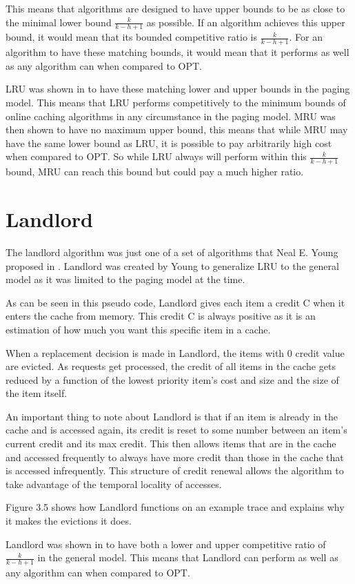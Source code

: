 This means that algorithms are designed to have upper bounds to be as close to the minimal lower bound $\frac{k}{k-h+1}$ as possible. If an algorithm achieves this upper bound, it would mean that its bounded competitive ratio is $\frac{k}{k-h+1}$. For an algorithm to have these matching bounds, it would mean that it performs as well as any algorithm can when compared to OPT.

LRU was shown in \cite{sleator1985amortized} to have these matching lower and upper bounds in the paging model. This means that LRU performs competitively to the minimum bounds of online caching algorithms in any circumstance in the paging model.
MRU was then shown \cite{agrawal2007worst} to have no maximum upper bound, this means that while MRU may have the same lower bound as LRU, it is possible to pay arbitrarily high cost when compared to OPT. So while LRU always will perform within this $\frac{k}{k-h+1}$ bound, MRU can reach this bound but could pay a much higher ratio.


\hfill \break
\hfill \break
\hfill \break


\section{Landlord}
The landlord algorithm was just one of a set of algorithms that Neal E. Young proposed in \cite{young1994k}. Landlord was created by Young to generalize LRU to the general model as it was limited to the paging model at the time. 



As can be seen in this pseudo code, Landlord gives each item a credit C when it enters the cache from memory. This credit C is always positive as it is an estimation of how much you want this specific item in a cache.

When a replacement decision is made in Landlord, the items with 0 credit value are evicted. As requests get processed, the credit of all items in the cache gets reduced by a function of the lowest priority item's cost and size and the size of the item itself.

An important thing to note about Landlord is that if an item is already in the cache and is accessed again, its credit is reset to some number between an item's current credit and its max credit. This then allows items that are in the cache and accessed frequently to always have more credit than those in the cache that is accessed infrequently. This structure of credit renewal allows the algorithm to take advantage of the temporal locality of accesses.

Figure 3.5 shows how Landlord functions on an example trace and explains why it makes the evictions it does.





Landlord was shown in \cite{young1994k} to have both a lower and upper competitive ratio of $\frac{k}{k-h+1}$ in the general model. This means that Landlord can perform as well as any algorithm can when compared to OPT.
